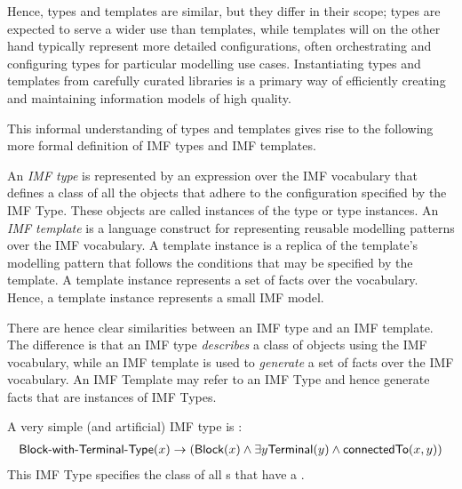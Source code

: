 Hence, types and templates are similar, but they differ in their scope; types are expected to serve a wider use than templates, while templates will on the other hand typically represent more detailed configurations, often orchestrating and configuring types for particular modelling use cases.
%
Instantiating types and templates from carefully curated libraries is a primary way of efficiently creating and maintaining information models of high quality.

This informal understanding of types and templates gives rise to the following more formal definition of IMF types and IMF templates.

An \emph{IMF type} is represented by an expression over the IMF
vocabulary that defines a class of all the objects that adhere to the
configuration specified by the IMF Type. These objects are called
instances of the type or type instances.
%
An \emph{IMF template} is a language construct for representing reusable
modelling patterns over the IMF vocabulary. A template instance is a
replica of the template's modelling pattern that follows the
conditions that may be specified by the template.  A template instance
represents a set of facts over the vocabulary. Hence, a template
instance represents a small IMF model.

There are hence clear similarities between an IMF type and an IMF
template.
The difference is that
an IMF type \emph{describes} a class of objects using the IMF vocabulary,
while
an IMF template is used to \emph{generate} a set of facts over the IMF vocabulary.
An IMF Template may refer to an IMF Type and hence
generate facts that are instances of IMF Types.

\begin{example}\label{ex:Block-with-Terminal-Type}
  A very simple (and artificial) IMF type is :
  \begin{align*}
    \textsf{Block-with-Terminal-Type}(x) \rightarrow  ( \textsf{Block}(x) \land \exists y \textsf{Terminal}(y) \land \textsf{connectedTo}(x,y) )
  \end{align*}
  This IMF Type specifies the class of all s that have a .
\end{example}

